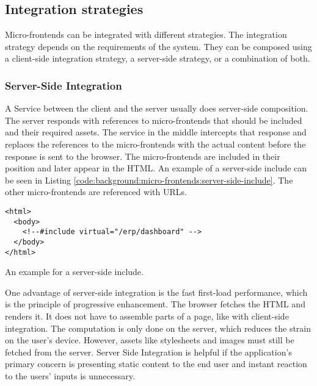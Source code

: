 \subsection{Integration strategies}\label{subsection:background:micro-frontend-architecture:integration-strategies}

Micro-frontends can be integrated with different strategies. The integration strategy depends on the requirements of the system. They can be composed using a client-side integration strategy, a server-side strategy, or a combination of both.

\subsubsection{Server-Side Integration}\label{subsubsection:background:micro-frontend-architecture:integration-strategies:server-side-integration}

A Service between the client and the server usually does server-side composition. \cite[60]{book:2020:geers:background:micro-frontends:micro-frontends-in-action} The server responds with references to micro-frontends that should be included and their required assets. The service in the middle intercepts that response and replaces the references to the micro-frontends with the actual content before the response is sent to the browser. The micro-frontends are included in their position and later appear in the \ac{HTML}. An example of a server-side include can be seen in Listing \ref{code:background:micro-frontends:server-side-include}. The other micro-frontends are referenced with \acp{URL}. \cite[61-63]{book:2020:geers:background:micro-frontends:micro-frontends-in-action}

\ifshowListings
\begin{listing}[H]
    \begin{verbatim}
<html>
  <body>
    <!--#include virtual="/erp/dashboard" -->
  </body>
</html>
    \end{verbatim}
    \caption{An example for a server-side include.}\label{code:background:micro-frontends:server-side-include}
\end{listing}
\fi

\bigskip

\noindent One advantage of server-side integration is the fast first-load performance, which is the principle of progressive enhancement. \cite{book:2010:parker:background:micro-frontends:designing-with-progressive-enhancement} The browser fetches the \ac{HTML} and renders it. It does not have to assemble parts of a page, like with client-side integration. The computation is only done on the server, which reduces the strain on the user's device. \cite{book:2020:geers:background:micro-frontends:micro-frontends-in-action} However, assets like stylesheets and images must still be fetched from the server. Server Side Integration is helpful if the application's primary concern is presenting static content to the end user and instant reaction to the users' inputs is unnecessary.  \cite[83]{book:2020:geers:background:micro-frontends:micro-frontends-in-action}

